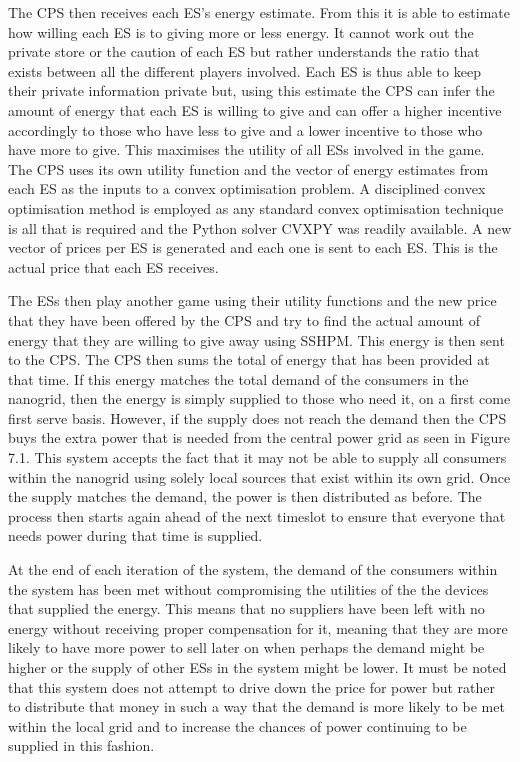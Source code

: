 \documentclass[a4paper, notitlepage]{report}
\begin{document}
The CPS then receives each ES's energy estimate. From this it is able to
estimate how willing each ES is to giving more or less energy. It cannot work
out the private store or the caution of each ES but rather understands the ratio
that exists between all the different players involved. Each ES is thus able to
keep their private information private but, using this estimate the CPS can infer the
amount of energy that each ES is willing to give and can offer a higher
incentive accordingly to those who have less to give and a lower incentive to
those who have more to give. This maximises the utility of all ESs involved in
the game. The CPS uses its own utility function and the vector of energy
estimates from each ES as the inputs to a convex optimisation problem. A
disciplined convex optimisation method is employed \cite{grant2006disciplined} as
any standard convex optimisation  technique is all that is required and the
Python solver CVXPY \cite{diamond2016cvxpy} was readily available. A new vector of
prices per ES is generated and each one is sent to each ES. This is the actual
price that each ES receives.

The ESs then play another game using their utility functions and the new price
that they have been offered by the CPS and try to find the actual amount of
energy that they are willing to give away using SSHPM. This energy is then sent
to the CPS. The CPS then sums the total of energy that has been provided at that
time. If this energy matches the total demand of the consumers in the nanogrid,
then the energy is simply supplied to those who need it, on a first come first
serve basis. However, if the supply does not reach the demand then the CPS buys
the extra power that is needed from the central power grid as seen in Figure
7.1. This system accepts the fact that it may not be able to supply all
consumers within the nanogrid using solely local sources that exist within its
own grid. Once the supply matches the demand, the power is then distributed as
before. The process then starts again ahead of the next timeslot to ensure that
everyone that needs power during that time is supplied.

At the end of each iteration of the system, the demand of the consumers within
the system has been met without compromising the utilities of the the devices
that supplied the energy. This means that no suppliers have been left with no
energy without receiving proper compensation for it, meaning that they are more
likely to have more power to sell later on when perhaps the demand might be
higher or the supply of other ESs in the system might be lower. It must be noted
that this system does not attempt to drive down the price for power but rather
to distribute that money in such a way that the demand is more likely to be met
within the local grid and to increase the chances of power continuing to be
supplied in this fashion.
\end{document}
